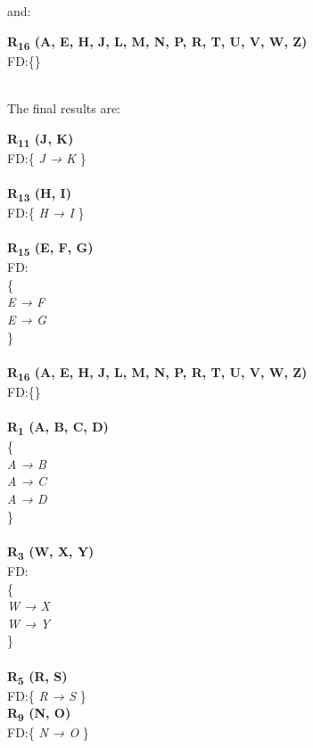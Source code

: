 and:\\

\begin{adjustwidth}{2cm}{}
\textbf{R\textsubscript{16} (A, E, H, J, L, M, N, P, R, T, U, V, W, Z)}\\
FD:\{\} \\ \\
\end{adjustwidth}

The final results are:\\

\begin{adjustwidth}{2cm}{}
\textbf{R\textsubscript{11} (J, K)}\\
FD:\{
\textit{ 
J → K 
}
\} \\ \\

\noindent
\textbf{R\textsubscript{13} (H, I)}\\
FD:\{
\textit{ 
H → I 
}
\} \\ \\

\noindent
\textbf{R\textsubscript{15} (E, F, G)}\\
FD:\\
\{\\
\textit{ 
E → F\\
E → G\\
}
\} \\ \\

\noindent
\textbf{R\textsubscript{16} (A, E, H, J, L, M, N, P, R, T, U, V, W, Z)}\\
FD:\{\} \\ \\

\noindent
\textbf{R\textsubscript{1} (A, B, C, D)}\\
\{\\ 
\textit{
A → B\\
A → C\\
A → D\\
} 
\}\\ \\

\noindent
\textbf{R\textsubscript{3} (W, X, Y)}\\
FD:\\
\{\\
\textit{ 
W → X\\
W → Y\\ 
}
\} \\ \\

\noindent
\textbf{R\textsubscript{5} (R, S)}\\
FD:\{
\textit{ 
R → S 
}
\} \\

\noindent
\textbf{R\textsubscript{9} (N, O)}\\
FD:\{
\textit{ 
N → O 
}
\} \\


\end{adjustwidth} 




\clearpage